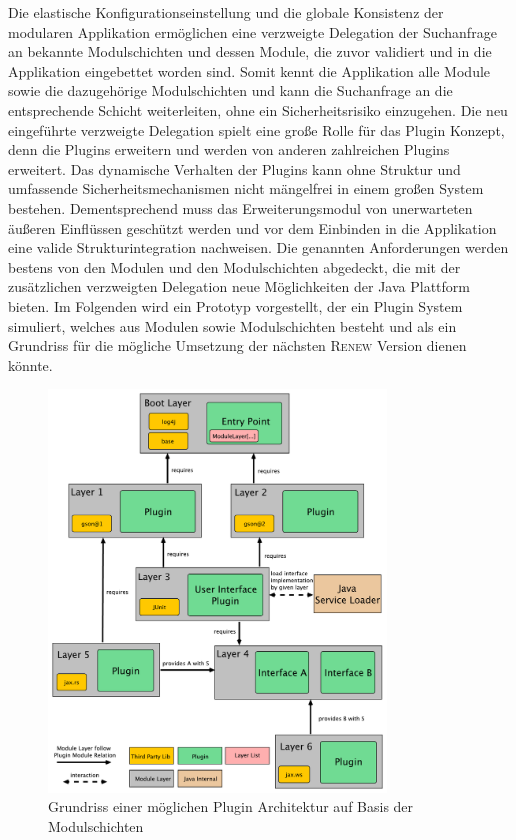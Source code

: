			Die elastische Konfigurationseinstellung und die globale Konsistenz der modularen Applikation ermöglichen eine verzweigte Delegation der Suchanfrage an bekannte Modulschichten und dessen Module, die zuvor validiert und in die Applikation eingebettet worden sind. Somit kennt die Applikation alle Module sowie die dazugehörige Modulschichten und kann die Suchanfrage an die entsprechende Schicht weiterleiten, ohne ein Sicherheitsrisiko einzugehen.\newline
			Die neu eingeführte verzweigte Delegation spielt eine große Rolle für das Plugin Konzept, denn die Plugins erweitern und werden von anderen zahlreichen Plugins erweitert. Das dynamische Verhalten der Plugins kann ohne Struktur und umfassende Sicherheitsmechanismen nicht mängelfrei in einem großen System bestehen.  Dementsprechend muss das Erweiterungsmodul von unerwarteten äußeren Einflüssen geschützt werden und vor dem Einbinden in die Applikation eine valide Strukturintegration nachweisen. Die genannten Anforderungen werden bestens von den Modulen und den Modulschichten abgedeckt, die mit der zusätzlichen verzweigten Delegation neue Möglichkeiten der Java Plattform bieten.\bigbreak
			Im Folgenden wird ein Prototyp vorgestellt, der ein Plugin System simuliert, welches aus Modulen sowie  Modulschichten besteht und als ein Grundriss für die mögliche Umsetzung der nächsten \textsc{Renew} Version dienen könnte. \bigbreak
			
			 \begin{figure}[h!]
			   \centering
			   \captionsetup{justification=centering}
			   \includegraphics[width=0.8\textwidth]{material/images/ModulLayerDepsDraw.pdf}
			   \caption{Grundriss einer möglichen Plugin Architektur auf Basis der Modulschichten}
			   \label{fig:ModSchichtKonzept}
			 \end{figure}
			
